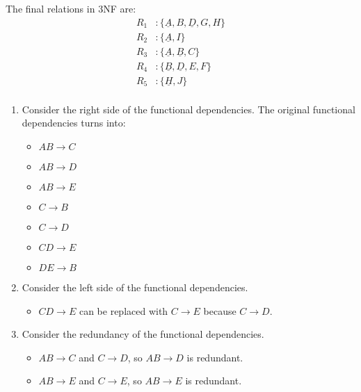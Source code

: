 \documentclass[11pt,letterpaper,titlepage,en-US]{article}
\begin{document}
\begin{homeworkProblem}
    The final relations in 3NF are:
    \begin{align*}
        R_1& : \{\underline{A}, B, \underline{D}, G, H\}\\
        R_2& : \{\underline{A}, I\}\\
        R_3& : \{\underline{A}, \underline{B}, C\}\\
        R_4& : \{\underline{B}, \underline{D}, E, F\}\\
        R_5& : \{\underline{H}, J\}\\
    \end{align*}

\end{homeworkProblem}
\pagebreak
\begin{homeworkProblem}
    \begin{enumerate}[label=\textbf{Step {\arabic*}}, leftmargin=2cm]
        \item Consider the right side of the functional dependencies.
            The original functional dependencies turns into:
            \begin{itemize}
                \item $AB \rightarrow C$
                \item $AB \rightarrow D$
                \item $AB \rightarrow E$
                \item $C \rightarrow B$
                \item $C \rightarrow D$
                \item $CD \rightarrow E$
                \item $DE \rightarrow B$
            \end{itemize}
        \item Consider the left side of the functional dependencies.
            \begin{itemize}
                \item $CD \rightarrow E$ can be replaced with $C \rightarrow E$ because $C \rightarrow D$.
            \end{itemize}
        \item Consider the redundancy of the functional dependencies.
            \begin{itemize}
                \item $AB \rightarrow C$ and $C \rightarrow D$, so $AB \rightarrow D$ is redundant.
                \item $AB \rightarrow E$ and $C \rightarrow E$, so $AB \rightarrow E$ is redundant.

\end{itemize}
\end{enumerate}
\end{homeworkProblem}
\end{document}
